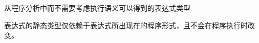 从程序分析中而不需要考虑执行语义可以得到的表达式类型

\begin{note}[\noindent]
  表达式的静态类型仅依赖于表达式所出现在的程序形式，且不会在程序执行时改变。
\end{note}
